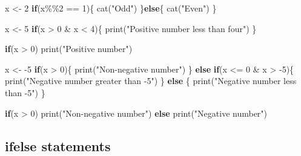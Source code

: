 \documentclass[
]{book}
\newenvironment{Shaded}{\begin{snugshade}}{\end{snugshade}}
\newcommand{\ControlFlowTok}[1]{\textcolor[rgb]{0.13,0.29,0.53}{\textbf{#1}}}
\newcommand{\DecValTok}[1]{\textcolor[rgb]{0.00,0.00,0.81}{#1}}
\newcommand{\FunctionTok}[1]{\textcolor[rgb]{0.00,0.00,0.00}{#1}}
\newcommand{\NormalTok}[1]{#1}
\newcommand{\OtherTok}[1]{\textcolor[rgb]{0.56,0.35,0.01}{#1}}
\newcommand{\SpecialCharTok}[1]{\textcolor[rgb]{0.00,0.00,0.00}{#1}}
\newcommand{\StringTok}[1]{\textcolor[rgb]{0.31,0.60,0.02}{#1}}
\begin{document}
\begin{Shaded}
\begin{Highlighting}[]
\NormalTok{x }\OtherTok{\textless{}{-}} \DecValTok{2}
\ControlFlowTok{if}\NormalTok{(x}\SpecialCharTok{\%\%}\DecValTok{2} \SpecialCharTok{==} \DecValTok{1}\NormalTok{)\{}
  \FunctionTok{cat}\NormalTok{(}\StringTok{"Odd"}\NormalTok{)}
\NormalTok{\}}\ControlFlowTok{else}\NormalTok{\{}
  \FunctionTok{cat}\NormalTok{(}\StringTok{"Even"}\NormalTok{)}
\NormalTok{\} }

\NormalTok{x }\OtherTok{\textless{}{-}} \DecValTok{5}
\ControlFlowTok{if}\NormalTok{(x }\SpecialCharTok{\textgreater{}} \DecValTok{0} \SpecialCharTok{\&}\NormalTok{ x }\SpecialCharTok{\textless{}} \DecValTok{4}\NormalTok{)\{}
  \FunctionTok{print}\NormalTok{(}\StringTok{"Positive number less than four"}\NormalTok{)}
\NormalTok{\}}

\ControlFlowTok{if}\NormalTok{(x }\SpecialCharTok{\textgreater{}} \DecValTok{0}\NormalTok{) }\FunctionTok{print}\NormalTok{(}\StringTok{"Positive number"}\NormalTok{)}

\NormalTok{x }\OtherTok{\textless{}{-}} \SpecialCharTok{{-}}\DecValTok{5}
\ControlFlowTok{if}\NormalTok{(x }\SpecialCharTok{\textgreater{}} \DecValTok{0}\NormalTok{)\{}
  \FunctionTok{print}\NormalTok{(}\StringTok{"Non{-}negative number"}\NormalTok{)}
\NormalTok{\} }\ControlFlowTok{else} \ControlFlowTok{if}\NormalTok{(x }\SpecialCharTok{\textless{}=} \DecValTok{0} \SpecialCharTok{\&}\NormalTok{ x }\SpecialCharTok{\textgreater{}} \SpecialCharTok{{-}}\DecValTok{5}\NormalTok{)\{}
  \FunctionTok{print}\NormalTok{(}\StringTok{"Negative number greater than {-}5"}\NormalTok{)}
\NormalTok{\} }\ControlFlowTok{else}\NormalTok{ \{}
  \FunctionTok{print}\NormalTok{(}\StringTok{"Negative number less than {-}5"}\NormalTok{)}
\NormalTok{\}}

\ControlFlowTok{if}\NormalTok{(x }\SpecialCharTok{\textgreater{}} \DecValTok{0}\NormalTok{)}
  \FunctionTok{print}\NormalTok{(}\StringTok{"Non{-}negative number"}\NormalTok{)}
\ControlFlowTok{else}
  \FunctionTok{print}\NormalTok{(}\StringTok{"Negative number"}\NormalTok{)}
\end{Highlighting}
\end{Shaded}

\hypertarget{ifelse-statements}{%
\subsection{ifelse statements}\label{ifelse-statements}}
\end{document}
